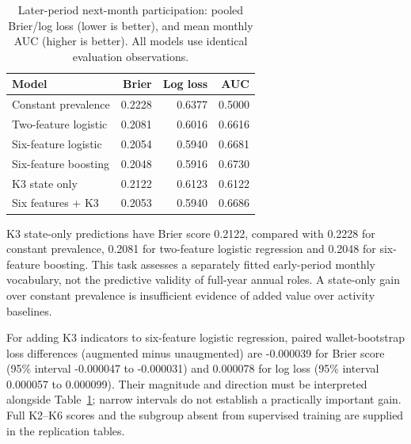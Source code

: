 \documentclass[journal,letterpaper]{IEEEtran}
\begin{document}
\begin{table}[t]
\centering\footnotesize
\caption{Later-period next-month participation: pooled Brier/log loss (lower is better), and mean monthly AUC (higher is better). All models use identical evaluation observations.}
\label{tab:participationprediction}
\begin{tabular}{lrrr}
\toprule
Model & Brier & Log loss & AUC \\
\midrule
Constant prevalence & 0.2228 & 0.6377 & 0.5000 \\
Two-feature logistic & 0.2081 & 0.6016 & 0.6616 \\
Six-feature logistic & 0.2054 & 0.5940 & 0.6681 \\
Six-feature boosting & 0.2048 & 0.5916 & 0.6730 \\
K3 state only & 0.2122 & 0.6123 & 0.6122 \\
Six features + K3 & 0.2053 & 0.5940 & 0.6686 \\
\bottomrule
\end{tabular}
\end{table}
K3 state-only predictions have Brier score 0.2122, compared with 0.2228 for constant prevalence, 0.2081 for two-feature logistic regression and 0.2048 for six-feature boosting. This task assesses a separately fitted early-period monthly vocabulary, not the predictive validity of full-year annual roles. A state-only gain over constant prevalence is insufficient evidence of added value over activity baselines.

For adding K3 indicators to six-feature logistic regression, paired wallet-bootstrap loss differences (augmented minus unaugmented) are -0.000039 for Brier score (95\% interval -0.000047 to -0.000031) and 0.000078 for log loss (95\% interval 0.000057 to 0.000099). Their magnitude and direction must be interpreted alongside Table~\ref{tab:participationprediction}; narrow intervals do not establish a practically important gain. Full K2--K6 scores and the subgroup absent from supervised training are supplied in the replication tables.
\end{document}
